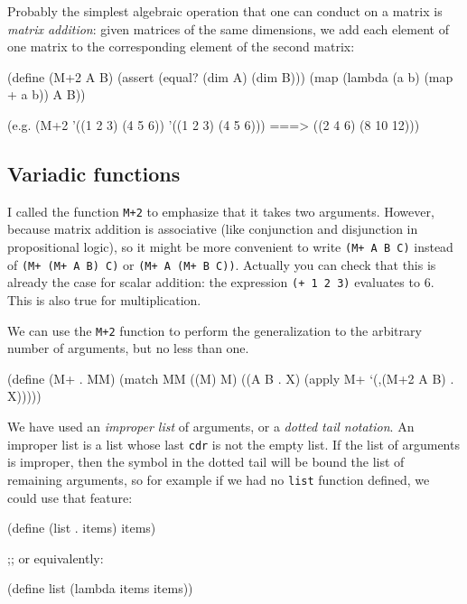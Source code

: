 Probably the simplest algebraic operation that one can
conduct on a matrix is \textit{matrix addition}: given
matrices of the same dimensions, we add each element
of one matrix to the corresponding element of the
second matrix:

\begin{Snippet}
(define (M+2 A B)
  (assert (equal? (dim A) (dim B)))
  (map (lambda (a b)
	 (map + a b))
       A B))
\end{Snippet}
\begin{Snippet}
(e.g.
 (M+2 '((1 2 3)
        (4 5 6)) '((1 2 3)
                   (4 5 6))) ===> ((2  4  6)
                                   (8 10 12)))
\end{Snippet}

\subsection{Variadic functions}

I called the function \texttt{M+2} to emphasize that it
takes two arguments. However, because matrix addition is
associative (like conjunction and disjunction in propositional
logic), so it might be more convenient to write
\texttt{(M+ A B C)} instead of \texttt{(M+ (M+ A B) C)}
or \texttt{(M+ A (M+ B C))}. Actually you can check that
this is already the case for scalar addition: the
expression \texttt{(+ 1 2 3)} evaluates to $6$. This
is also true for multiplication.

We can use the \texttt{M+2} function to perform the
generalization to the arbitrary number of arguments,
but no less than one.

\begin{Snippet}
(define (M+ . MM)
  (match MM
    ((M)
     M)
    ((A B . X)
     (apply M+ `(,(M+2 A B) . X)))))
\end{Snippet}

We have used an \textit{improper list} of arguments,
or a \textit{dotted tail notation}. An improper list
is a list whose last \texttt{cdr} is not the empty
list. If the list of arguments is improper, then the
symbol in the dotted tail will be bound the list of
remaining arguments, so for example if we had no
\texttt{list} function defined, we could use that
feature:

\begin{Snippet}
(define (list . items)
  items)
\end{Snippet}
\begin{Snippet}
;; or equivalently:
\end{Snippet}
\begin{Snippet}
(define list (lambda items items))
\end{Snippet}

